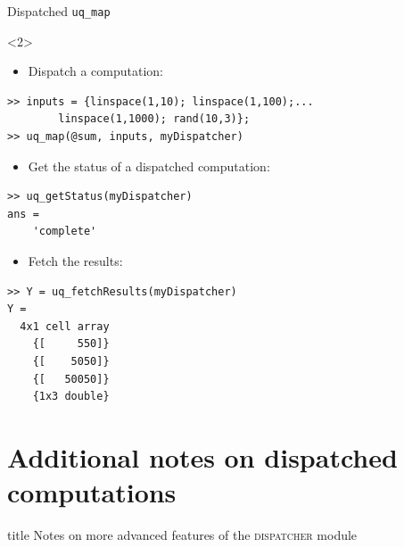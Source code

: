 \documentclass[]{rsuqbeamernew}
\begin{document}
\begin{frame}[fragile]{Dispatched \texttt{uq\_map}}
\begin{onlyenv}<2>
\begin{itemize}
  \item Dispatch a  computation:
\end{itemize}
\begin{lstlisting}[numbers=none]
>> inputs = {linspace(1,10); linspace(1,100);... 
        linspace(1,1000); rand(10,3)};
>> uq_map(@sum, inputs, myDispatcher)
\end{lstlisting}
\begin{itemize}
  \item Get the status of a dispatched computation:
\end{itemize}
\begin{lstlisting}[numbers=none]
>> uq_getStatus(myDispatcher)
ans =
    'complete'
\end{lstlisting}
\begin{itemize}
  \item Fetch the results:
\end{itemize}
\begin{lstlisting}[numbers=none]
>> Y = uq_fetchResults(myDispatcher)
Y =
  4x1 cell array
    {[     550]}
    {[    5050]}
    {[   50050]}
    {1x3 double}
\end{lstlisting}
\end{onlyenv}

\end{frame}

\section{Additional notes on dispatched computations}

\begin{frame}
  \vfill
  \centering
  \begin{beamercolorbox}[sep=8pt,center,shadow=true,rounded=true]{title}
  Notes on more advanced features of the \textsc{dispatcher} module\par%
\end{beamercolorbox}
\vfill
\end{frame}
\end{document}
